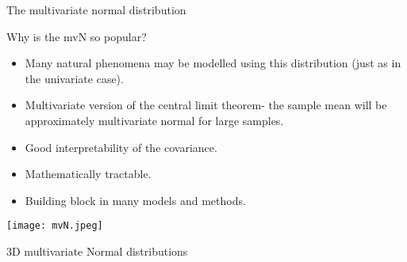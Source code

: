 \documentclass[ignorenonframetext,]{beamer}
\providecommand{\tightlist}{%
  \setlength{\itemsep}{0pt}\setlength{\parskip}{0pt}}
\begin{document}
\begin{frame}

\end{frame}

\begin{frame}{The multivariate normal distribution}
\protect\hypertarget{the-multivariate-normal-distribution}{}

\vspace{2mm}

Why is the mvN so popular?

\begin{itemize}
\tightlist
\item
  Many natural phenomena may be modelled using this distribution (just
  as in the univariate case).
\item
  Multivariate version of the central limit theorem- the sample mean
  will be approximately multivariate normal for large samples.
\item
  Good interpretability of the covariance.
\item
  Mathematically tractable.
\item
  Building block in many models and methods.
\end{itemize}

\end{frame}

\begin{frame}

\centering

\texttt{[image: mvN.jpeg]}

3D multivariate Normal distributions

\end{frame}
\end{document}
